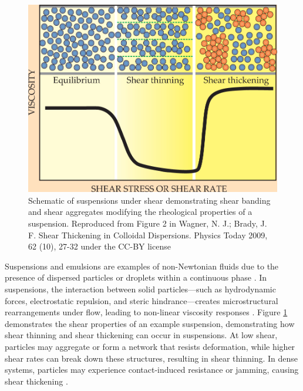 \begin{figure}
    \centering
    \includegraphics[scale = 0.3]{../figures/literature_review/shear_suspensions.jpeg}
    \caption{Schematic of suspensions under shear demonstrating shear banding and shear aggregates modifying the rheological properties of a suspension. 
             Reproduced from Figure 2 in Wagner, N. J.; Brady, J. F. Shear Thickening in Colloidal Dispersions. Physics Today 2009, 62 (10), 27-32 under the CC-BY license}
    \label{fig:suspension_shear}
\end{figure}

Suspensions and emulsions are examples of non-Newtonian fluids due to the presence of dispersed particles or droplets within a continuous phase
\cite{brader_nonlinear_2010, besseling_three-dimensional_2007, xu_relation_2013}.
In suspensions, the interaction  between solid particles—such as hydrodynamic forces, electrostatic repulsion, and steric hindrance—creates microstructural rearrangements under flow, leading to 
non-linear viscosity responses \cite{brader_nonlinear_2010, besseling_three-dimensional_2007}. Figure \ref{fig:suspension_shear} demonstrates the shear properties of an example suspension, 
demonstrating how shear thinning and shear thickening can occur in suspensions. At low shear, particles may aggregate or form a network that resists deformation, while higher shear rates can break 
down these structures, resulting in shear thinning. In dense systems, particles may experience contact-induced resistance or jamming, causing shear thickening \cite{brader_nonlinear_2010}. 

